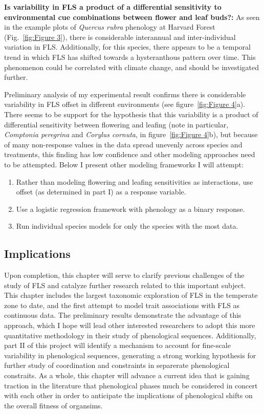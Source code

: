 \documentclass{article}\usepackage[]{graphicx}\usepackage[]{color}
\begin{document}
\par\textbf{Is variability in FLS a product of a differential sensitivity to environmental cue combinations between flower and leaf buds?:} As seen in the  example plots of \textit{Quercus rubra} phenology at Harvard Forest (Fig.~\ref{fig:Figure 3}), there is considerable interannual and inter-individual variation in FLS. Additionally, for this species, there appears to be a temporal trend in which FLS has shifted towards a hysteranthous pattern over time. This phenomenon could be correlated with climate change, and should be investigated further.
\par Preliminary analysis of my experimental result confirms there is considerable variability in FLS offset in different environments (see figure~\ref{fig:Figure 4}a).  There seems to be support for the hypothesis that this variability is a product of differential sensitivity between flowering and leafing (note in particular, \textit{Comptonia peregrina} and \textit{Corylus cornuta}, in figure~\ref{fig:Figure 4}b), but because of many non-response values in the data spread unevenly across species and treatments, this finding has low confidence and other modeling approaches need to be attempted. Below I present other modeling frameworks I will attempt:
\begin{enumerate}
\item Rather than modeling flowering and leafing sensitivities as interactions, use offset (as determined in part I) as a response variable.
\item Use a logistic regression framework with phenology as a binary response.
\item Run individual species models for only the species with the most data.
\end{enumerate}
\subsection*{Implications}
\indent\indent Upon completion, this chapter will serve to clarify previous challenges of the study of FLS and catalyze further research related to this important subject. This chapter includes the largest taxonomic exploration of FLS in the temperate zone to date, and the first attempt to model trait associations with FLS as continuous data. The preliminary results demonstrate the advantage of this approach, which I hope will lead other interested researchers to adopt this more quantitative methodology in their study of phenological sequences. Additionally, part II of this project will identify a mechanism to account for fine-scale variability in phenological sequences, generating a strong working hypothesis for further study of coordination and constraints in separerate phenological constraits. As a whole, this chapter will advance a current idea that is gaining traction in the literature that phenological phases much be considered in concert with each other in order to anticipate the implications of phenological shifts on the overall fitness of organsims.
\end{document}
